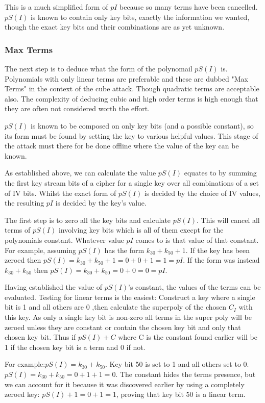 \documentclass{report}
\let\Oldsubsubsection\subsubsection
\renewcommand{\subsubsection}{\FloatBarrier\Oldsubsubsection}
\begin{document}
This is a much simplified form of $pI$ because so many terms have been cancelled. $pS(I)$ is known to contain only key bits, exactly the information we wanted, though the exact key bits and their combinations are as yet unknown.

\subsubsection{Max Terms}
The next step is to deduce what the form of the polynomail $pS(I)$ is. Polynomials with only linear terms are preferable and these are dubbed "Max Terms" in the context of the cube attack. Though quadratic terms are acceptable also. The complexity of deducing cubic and high order terms is high enough that they are often not considered worth the effort.%

$pS(I)$ is known to be composed on only key bits (and a possible constant), so its form must be found by setting the key to various helpful values. This stage of the attack must there for be done offline where the value of the key can be known.

As established above, we can calculate the value $pS(I)$ equates to by summing the first key stream bits of a cipher for a single key over all combinations of a set of IV bits. Whilst the exact form of $pS(I)$ is decided by the choice of IV values, the resulting $pI$ is decided by the key's value.

The first step is to zero all the key bits and calculate $pS(I)$. This will cancel all terms of $pS(I)$ involving key bits which is all of them execpt for the polynomials constant. Whatever value $pI$ comes to is that value of that constant. For example, assuming $pS(I)$ has the form $k_{30}+k_{50}+1$. If the key has been zeroed then $pS(I)=k_{30}+k_{50}+1=0+0+1=1=pI$. If the form was instead $k_{30}+k_{50}$ then $pS(I)=k_{30}+k_{50}=0+0=0=pI$.

Having established the value of $pS(I)$'s constant, the values of the terms can be evaluated. Testing for linear terms is the easiest: Construct a key where a single bit is 1 and all others are 0 ,then calculate the superpoly of the chosen $C_I$ with this key. As only a single key bit is non-zero all terms in the super poly will be zeroed unless they are constant or contain the chosen key bit and only that chosen key bit. Thus if $pS(I)+C$ where C is the constant found earlier will be 1 if the chosen key bit is a term and 0 if not.

For example:$pS(I)=k_{30}+k_{50}$. Key bit 50 is set to 1 and all others set to 0. $pS(I)=k_{30}+k_{50}=0+1+1=0$. The constant hides the terms presence, but we can account for it because it was discovered earlier by using a completely zeroed key: $pS(I)+1=0+1=1$, proving that key bit 50 is a linear term.
\end{document}
